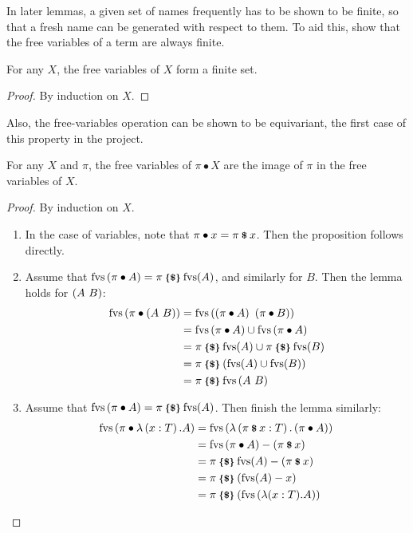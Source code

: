 In later lemmas, a given set of names frequently has to be shown to be finite, so that a fresh name can be generated with respect to them.
To aid this, show that the free variables of a term are always finite.
\begin{lemma}
For any \(X\), the free variables of \(X\) form a finite set.
\end{lemma}
\begin{proof}
By induction on \(X\).
\end{proof}

Also, the free-variables operation can be shown to be equivariant, the first case of this property in the project.
\begin{lemma}
For any \(X\) and \(\pi\), the free variables of \(\pi \bullet X\) are the image of \(\pi\) in the free variables of \(X\).
\end{lemma}
\begin{proof}
By induction on \(X\).
\begin{enumerate}
\item
In the case of variables, note that \(\pi \bullet x = \pi \mathbin{\textrm{\footnotesize{\textbf{\$}}}} x\).
Then the proposition follows directly.
\item
Assume that \(\mathrm{fvs}\left(\pi \bullet A\right) = \pi \mathbin{\textrm{\footnotesize{\textbf{\{\$\}}}}} \mathrm{fvs}(A)\), and similarly for \(B\).
Then the lemma holds for \(\left(A\ B\right)\):
\begin{align*}
\mathrm{fvs}\left(\pi \bullet \left(A\ B\right)\right)
&= \mathrm{fvs}\left(\left(\pi \bullet A\right)\ \left(\pi \bullet B\right)\right)\\
&= \mathrm{fvs}\left(\pi \bullet A\right) \cup \mathrm{fvs}\left(\pi \bullet A\right)\\
&= \pi \mathbin{\textrm{\footnotesize{\textbf{\{\$\}}}}} \mathrm{fvs}(A) \cup \pi \mathbin{\textrm{\footnotesize{\textbf{\{\$\}}}}} \mathrm{fvs}(B)\\
&= \pi \mathbin{\textrm{\footnotesize{\textbf{\{\$\}}}}} \left(\mathrm{fvs}(A) \cup \mathrm{fvs}(B)\right)\\
&= \pi \mathbin{\textrm{\footnotesize{\textbf{\{\$\}}}}} \mathrm{fvs}\left(A\ B\right)
\end{align*}
\item
Assume that \(\mathrm{fvs}\left(\pi \bullet A\right) = \pi \mathbin{\textrm{\footnotesize{\textbf{\{\$\}}}}} \mathrm{fvs}(A)\).
Then finish the lemma similarly:
\begin{align*}
\mathrm{fvs}\left(\pi \bullet \lambda \left(x:T\right).A\right) 
&= \mathrm{fvs}\left(\lambda \left(\pi \mathbin{\textrm{\footnotesize{\textbf{\$}}}} x : T\right). \left(\pi \bullet A\right)\right)\\
&= \mathrm{fvs}\left(\pi \bullet A\right) - \left(\pi \mathbin{\textrm{\footnotesize{\textbf{\$}}}} x\right)\\
&= \pi \mathbin{\textrm{\footnotesize{\textbf{\{\$\}}}}} \mathrm{fvs}(A) - \left(\pi \mathbin{\textrm{\footnotesize{\textbf{\$}}}} x\right)\\
&= \pi \mathbin{\textrm{\footnotesize{\textbf{\{\$\}}}}} \left(\mathrm{fvs}(A) - x\right)\\
&= \pi \mathbin{\textrm{\footnotesize{\textbf{\{\$\}}}}} \left(\mathrm{fvs}\left(\lambda (x:T).A\right)\right)
\end{align*}
\end{enumerate}
\end{proof}

